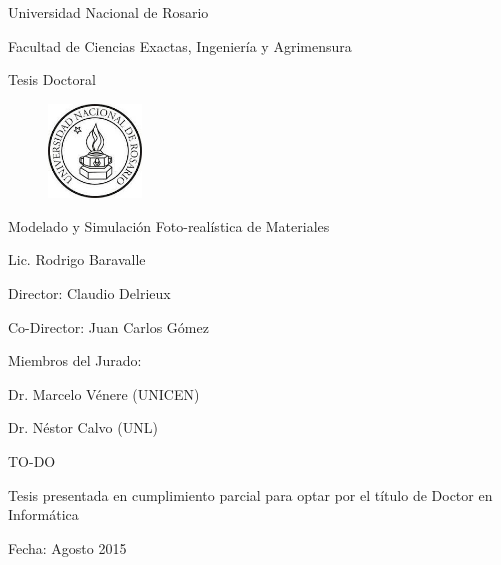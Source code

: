 
\begin{titlepage}
\begin{center}

Universidad Nacional de Rosario

Facultad de Ciencias Exactas, Ingeniería y Agrimensura

Tesis Doctoral

\begin{figure}[h!]
\centering
\includegraphics[width=2.5cm]{figures/logounr}
\end{figure}

\vspace{2cm}


{\huge Modelado y Simulación Foto-realística de Materiales}
\vspace{2cm}

{\large Lic. Rodrigo Baravalle}
\vspace{2cm}

{\large Director: Claudio Delrieux}

{\large Co-Director: Juan Carlos Gómez}

\vspace{2cm}
{\large Miembros del Jurado:}

{\large Dr. Marcelo Vénere (UNICEN)}

{\large Dr. Néstor Calvo (UNL)}

{\large TO-DO}

\vspace{2cm}
{\large Tesis presentada en cumplimiento parcial para optar por el título de Doctor en Informática}

\vspace{1cm}
Fecha: Agosto 2015
\end{center}
\end{titlepage}

